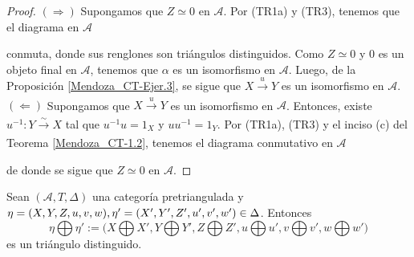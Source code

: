 \documentclass[tesis]{subfiles}
\begin{document}
\begin{proof}\leavevmode

    $(\Rightarrow)$ Supongamos que $Z\simeq0$ en $\mathscr{A}$. Por (TR1a) y (TR3), tenemos que el diagrama en $\mathscr{A}$
    \begin{center}
    \end{center}
    conmuta, donde sus renglones son triángulos distinguidos. Como $Z\simeq0$ y $0$ es un objeto final en $\mathscr{A}$, tenemos que $\alpha$ es un isomorfismo en $\mathscr{A}$. Luego, de la Proposición \ref{Mendoza_CT-Ejer.3}, se sigue que $X\xrightarrow[]{u}Y$ es un isomorfismo en $\mathscr{A}$. \\

    $(\Leftarrow)$ Supongamos que $X\xrightarrow[]{u}Y$ es un isomorfismo en $\mathscr{A}$. Entonces, existe $u^{-1}:Y\xrightarrow[]{\sim}X$ tal que $u^{-1}u=1_X$ y $uu^{-1}=1_Y$. Por (TR1a), (TR3) y el inciso (c) del Teorema \ref{Mendoza_CT-1.2}, tenemos el diagrama conmutativo en $\mathscr{A}$
    \begin{center}
    \end{center}
    de donde se sigue que $Z\simeq0$ en $\mathscr{A}$.
\end{proof}


\begin{Prop}\label{Mendoza_CT-1.5}
    Sean $(\mathscr{A},T,\Delta)$ una categoría pretriangulada y $\eta=(X,Y,Z,u,v,w), \eta' = (X',Y',\break Z',u',v',w')\in\Delta$. Entonces
    \[
        \eta\bigoplus\eta' := \big(X\bigoplus X', Y\bigoplus Y', Z\bigoplus Z', u\bigoplus u', v\bigoplus v', w\bigoplus w'\big)
    \] 
    es un triángulo distinguido.
\end{Prop}
\end{document}

